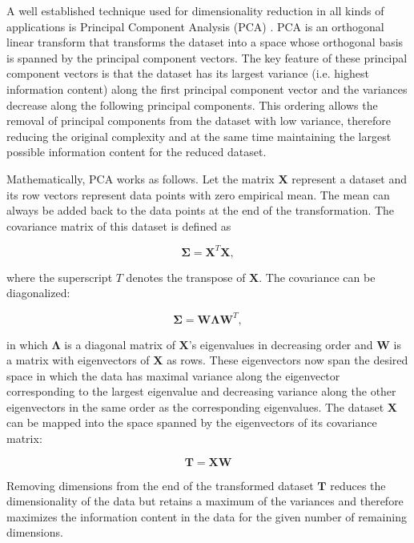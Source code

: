 \documentclass[english, a4paper, 12pt, titlepage, draft]{article}
\newcommand{\vect}[1]{\mathbf{#1}}
\begin{document}
A well established technique used for dimensionality reduction in all kinds of applications is Principal Component Analysis (PCA) \cite{PCAoriginal, PCA}.
PCA is an orthogonal linear transform that transforms the dataset into a space whose orthogonal basis is spanned by the principal component vectors.
The key feature of these principal component vectors is that the dataset has its largest variance (i.e. highest information content) along the first principal component vector and the variances decrease along the following principal components.
This ordering allows the removal of principal components from the dataset with low variance, therefore reducing the original complexity and at the same time maintaining the largest possible information content for the reduced dataset.

Mathematically, PCA works as follows.
Let the matrix $\vect{X}$ represent a dataset and its row vectors represent data points with zero empirical mean.
The mean can always be added back to the data points at the end of the transformation.
The covariance matrix of this dataset is defined as

\begin{equation}
    \vect{\Sigma} = \vect{X}^{T} \vect{X},
\end{equation}

\noindent
where the superscript $T$ denotes the transpose of $\vect{X}$.
The covariance can be diagonalized:

\begin{equation}
    \vect{\Sigma} = \vect{W} \vect{\Lambda} \vect{W}^{T},
\end{equation}

\noindent
in which $\vect{\Lambda}$ is a diagonal matrix of $\vect{X}$'s eigenvalues in decreasing order and $\vect{W}$ is a matrix with eigenvectors of $\vect{X}$ as rows.
These eigenvectors now span the desired space in which the data has maximal variance along the eigenvector corresponding to the largest eigenvalue and decreasing variance along the other eigenvectors in the same order as the corresponding eigenvalues.
The dataset $\vect{X}$ can be mapped into the space spanned by the eigenvectors of its covariance matrix:

\begin{equation}
    \vect{T} = \vect{X} \vect{W}
\end{equation}

\noindent
Removing dimensions from the end of the transformed dataset $\vect{T}$ reduces the dimensionality of the data but retains a maximum of the variances and therefore maximizes the information content in the data for the given number of remaining dimensions.
\end{document}
